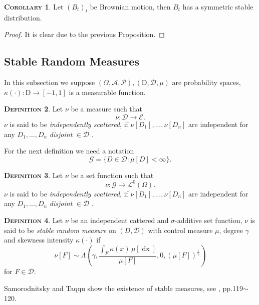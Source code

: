 \documentclass[a4paper, twoside, 11pt]{article}
\theoremstyle{definition}
\newtheorem{definition}{\scshape Definition}[section]
\newtheorem{corollary}[definition]{\scshape Corollary}
\newcommand{\brkt}[1]{\left({#1} \right)}
\begin{document}
\begin{corollary}
  Let $(B_t)_t$ be Brownian motion, then $B_t$ has a symmetric stable distribution.
\end{corollary}
\begin{proof}
  It is clear due to the previous Proposition.
\end{proof}

\subsection{Stable Random Measures}
In this subsection we suppose $(\Omega, \mathscr{A}, \mathcal{P}), (\mathrm{D}, \mathscr{D}, \mu)$  are probability spaces, $\kappa(\cdot) : \mathrm{D} \rightarrow [-1, 1]$ is a measurable function.
\begin{definition}
	Let $\nu$ be a measure such that
	\begin{equation}
	  \nu : \mathscr{D} \rightarrow \mathscr{E}.\nonumber
	\end{equation}
	$\nu$ is said to be \emph{independently scattered}, if $\nu[D_1], \dots, \nu[D_n]$ are independent for any $D_1,\dots, D_n$ \emph{disjoint} $\in \mathscr{D}$ .
\end{definition}

For the next definition we need a notation
\begin{equation}
  \mathscr{G} = \{D \in \mathscr{D} : \mu[D] < \infty\}.
\end{equation}

\begin{definition}
	Let $\nu$ be a set function such that
	\begin{equation}
	  \nu : \mathscr{G} \rightarrow \mathcal{L}^0(\Omega).\nonumber
	\end{equation}
	$\nu$ is said to be \emph{independently scattered}, if $\nu[D_1], \dots, \nu[D_n]$ are independent for any $D_1,\dots, D_n$ \emph{disjoint} $\in \mathscr{D}$ .
\end{definition}


\begin{definition}
  Let $\nu$ be an independent cattered and $\sigma$-additive set function,
$\nu$ is said to be \emph{stable random measure} on $(D, \mathscr{D})$ with control measure $\mu$, degree $\gamma$ and skewness intensity $\kappa(\cdot)$ if 
\begin{equation}
  \nu[F] \sim \Lambda\brkt{\gamma, \frac{\int_F \kappa(x)\, \mu[\mathop{dx}]}{\mu[F]}, 0, (\mu[F])^{\frac{1}{\gamma}}}
\end{equation}
for $F \in \mathscr{D}$.
\end{definition}
Samorodnitsky and Taqqu show the existence of stable measures, see \cite{samorodnitsky}, pp.119$\sim$120.
\end{document}
